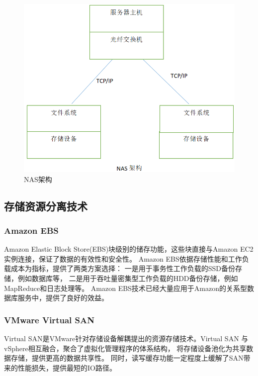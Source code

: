 \begin{figure}
\centering
\includegraphics[scale=0.45]{Figures/storage/nas_architecture.jpg}
\decoRule
\caption{NAS架构}
\label{fig:nas_architecture}
\end{figure}
\subsection{存储资源分离技术}
\subsubsection{Amazon EBS\cite{amazon2010amazon}}
Amazon Elastic Block Store(EBS)块级别的储存功能，这些块直接与Amazon EC2
实例连接，保证了数据的有效性和安全性。
Amazon EBS依据存储性能和工作负载成本为指标，提供了两类方案选择：
一是用于事务性工作负载的SSD备份存储，例如数据库等，
二是用于吞吐量密集型工作负载的HDD备份存储，例如MapReduce和日志处理等。
Amazon EBS技术已经大量应用于Amazon的关系型数据库服务中，提供了良好的效益。
\subsubsection{VMware Virtual SAN\cite{vmware2013vmware}}
Virtual SAN是VMware针对存储设备解耦提出的资源存储技术。Virtual SAN
与vSphere相互融合，聚合了虚拟化管理程序的体系结构，
将存储设备池化为共享数据存储，提供更高的数据共享性。
同时，读写缓存功能一定程度上缓解了SAN带来的性能损失，提供最短的IO路径。

